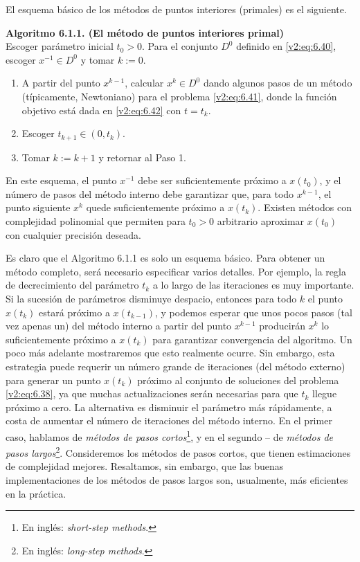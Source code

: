 El esquema básico de los métodos de puntos interiores (primales) es el siguiente.

\vspace{0.3cm}
\noindent \textbf{Algoritmo 6.1.1. (El método de puntos interiores primal)} \\
Escoger parámetro inicial $t_0 > 0$. Para el conjunto $D^0$ definido en \eqref{v2:eq:6.40}, escoger $x^{-1} \in D^0$ y tomar $k := 0$.
\begin{enumerate}[label=\arabic*., itemsep=0.1cm, topsep=0.1cm]
    \item A partir del punto $x^{k-1}$, calcular $x^k \in D^0$ dando algunos pasos de un método (típicamente, Newtoniano) para el problema \eqref{v2:eq:6.41}, donde la función objetivo está dada en \eqref{v2:eq:6.42} con $t = t_k$.
    \item Escoger $t_{k+1} \in (0, t_k)$.
    \item Tomar $k := k + 1$ y retornar al Paso 1.
\end{enumerate}
\vspace{0.3cm}

En este esquema, el punto $x^{-1}$ debe ser suficientemente próximo a $x(t_0)$, y el número de pasos del método interno debe garantizar que, para todo $x^{k-1}$, el punto siguiente $x^k$ quede suficientemente próximo a $x(t_k)$. Existen métodos con complejidad polinomial que permiten para $t_0 > 0$ arbitrario aproximar $x(t_0)$ con cualquier precisión deseada.

Es claro que el Algoritmo 6.1.1 es solo un esquema básico. Para obtener un método completo, será necesario especificar varios detalles. Por ejemplo, la regla de decrecimiento del parámetro $t_k$ a lo largo de las iteraciones es muy importante. Si la sucesión de parámetros disminuye despacio, entonces para todo $k$ el punto $x(t_k)$ estará próximo a $x(t_{k-1})$, y podemos esperar que unos pocos pasos (tal vez apenas un) del método interno a partir del punto $x^{k-1}$ producirán $x^k$ lo suficientemente próximo a $x(t_k)$ para garantizar convergencia del algoritmo. Un poco más adelante mostraremos que esto realmente ocurre. Sin embargo, esta estrategia puede requerir un número grande de iteraciones (del método externo) para generar un punto $x(t_k)$ próximo al conjunto de soluciones del problema \eqref{v2:eq:6.38}, ya que muchas actualizaciones serán necesarias para que $t_k$ llegue próximo a cero. La alternativa es disminuir el parámetro más rápidamente, a costa de aumentar el número de iteraciones del método interno. En el primer caso, hablamos de \textit{métodos de pasos cortos}\footnote{En inglés: \textit{short-step methods}.}, y en el segundo -- de \textit{métodos de pasos largos}\footnote{En inglés: \textit{long-step methods}.}. Consideremos los métodos de pasos cortos, que tienen estimaciones de complejidad mejores. Resaltamos, sin embargo, que las buenas implementaciones de los métodos de pasos largos son, usualmente, más eficientes en la práctica.

